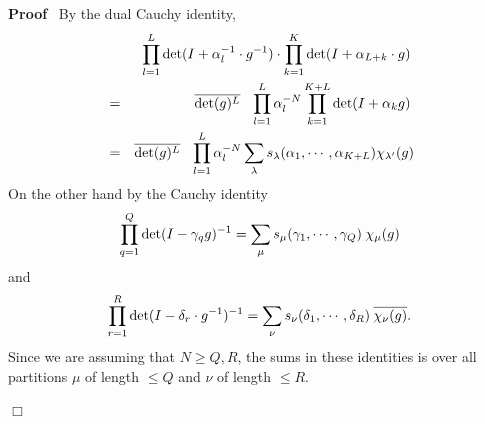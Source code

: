 \documentclass[11pt]{amsart}
\renewenvironment{proof}{
\noindent\textbf{Proof}\ }{\hspace*{\fill}
\begin{math}\Box\end{math}\medskip}
\begin{document}
\begin{proof}
By the dual Cauchy identity,
\begin{eqnarray}
   &  & \prod_{l = 1}^L \det ( I + \alpha_l^{- 1} \cdot g^{- 1} ) \cdot
   \prod_{k = 1}^K \det ( I + \alpha_{L + k} \cdot g ) \hspace{0.25em}
   \nonumber\\
   & = & \overline{\det ( g )^L} \hspace{0.75em} \prod_{l = 1}^L \alpha_l^{-
   N} \prod_{k = 1}^{K + L} \det ( I + \alpha_k g ) \hspace{0.25em}
   \nonumber\\
   & = & \overline{\det ( g )^L} \hspace{0.75em} \prod_{l = 1}^L \alpha_l^{-
   N} \sum_{\lambda} s_{\lambda} ( \alpha_1, \cdots, \alpha_{K + L} )
   \chi_{\lambda'} ( g )  \label{zirnalphaterms}
\end{eqnarray}
On the other hand by the Cauchy identity
\[ \prod_{q = 1}^Q \det ( I - \gamma_q g )^{- 1} = \sum_{\mu} s_{\mu} (
    \gamma_1, \cdots, \gamma_Q ) \hspace{0.25em} \chi_{\mu} ( g ) \]
and
\[ \prod_{r = 1}^R \det ( I - \delta_r \cdot g^{- 1} )^{- 1} = \sum_{\nu}
    s_{\nu} ( \delta_1, \cdots, \delta_R ) \hspace{0.25em}
    \overline{\chi_{\nu} ( g )} . \]
Since we are assuming that $N \geqslant Q, R$, the sums in these
identities is over all partitions $\mu$ of length $\leqslant Q$
and $\nu$ of length $\leqslant R$.


\end{proof}
\end{document}
